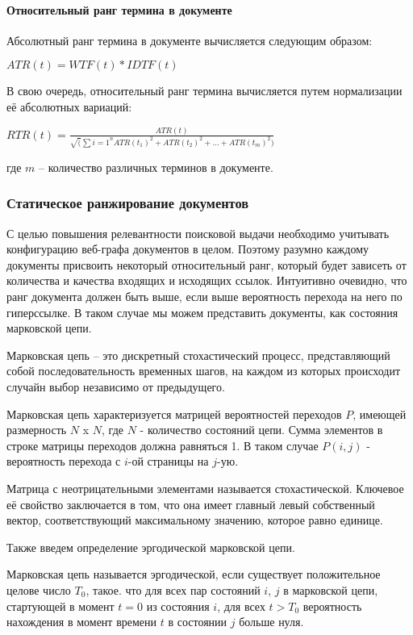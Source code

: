 \paragraph{Относительный ранг термина в документе}

Абсолютный ранг термина в документе вычисляется следующим образом:
\begin{center}
$ATR(t) = WTF(t) * IDTF(t)$
\end{center}

В свою очередь, относительный ранг термина вычисляется путем нормализации её абсолютных вариаций:
\begin{center}
$RTR(t) = \frac{ATR(t)}{\sqrt(\sum{i = 1}^{n}ATR(t_1)^2 + ATR(t_2)^2 + ... + ATR(t_m)^2)}$
\end{center} где $m$ -- количество различных терминов в документе.

\subsubsection{Статическое ранжирование документов}

С целью повышения релевантности поисковой выдачи необходимо учитывать конфигурацию веб-графа документов в целом. Поэтому разумно каждому документы присвоить некоторый относительный ранг, который будет зависеть от количества и качества входящих и исходящих ссылок. Интуитивно очевидно, что ранг документа должен быть выше, если выше вероятность перехода на него по гиперссылке. В таком случае мы можем представить документы, как состояния марковской цепи. 

Марковская цепь -- это дискретный стохастический процесс, представляющий собой последовательность временных шагов, на каждом из которых происходит случайн выбор независимо от предыдущего.

Марковская цепь характеризуется матрицей вероятностей переходов $P$, имеющей размерность $N$ x $N$, где $N$ - количество состояний цепи. Сумма элементов в строке матрицы переходов должна равняться 1. В таком случае $P(i, j)$ - вероятность перехода с $i$-ой страницы на $j$-ую.

Матрица с неотрицательными элементами называется стохастической. Ключевое её свойство заключается в том, что она имеет главный левый собственный вектор, соответствующий максимальному значению, которое равно единице.

Также введем определение эргодической марковской цепи.

Марковская цепь называется эргодической, если существует положительное целове число $T_0$, такое. что для всех пар состояний $i$, $j$ в марковской цепи, стартующей в момент $t = 0$ из состояния $i$, для всех $t > T_0$ вероятность нахождения в момент времени $t$ в состоянии $j$ больше нуля.

